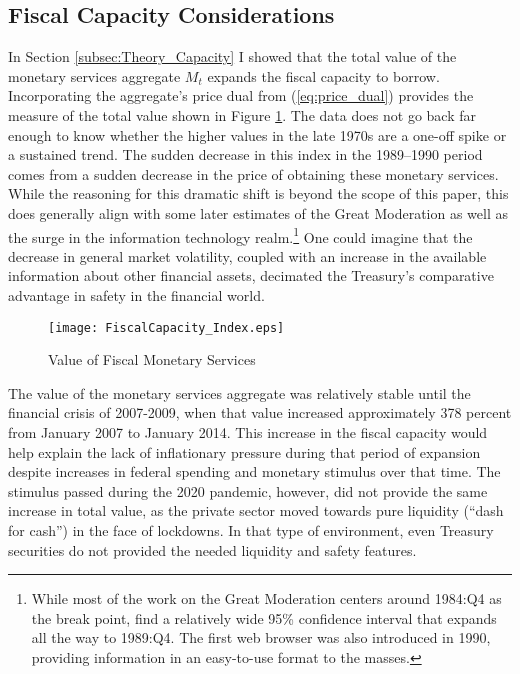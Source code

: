 \documentclass[11pt,a4paper,margin=1.5in]{article}
\begin{document}




\subsection{Fiscal Capacity Considerations}
\label{subsec:Results_Capacity}
In Section \ref{subsec:Theory_Capacity} I showed that the total value of the monetary services aggregate $M_t$ expands the fiscal capacity to borrow.
Incorporating the aggregate's price dual from (\ref{eq:price_dual}) provides the measure of the total value shown in Figure \ref{fig:FiscalServices_Value}.
The data does not go back far enough to know whether the higher values in the late 1970s are a one-off spike or a sustained trend. 
The sudden decrease in this index in the 1989--1990 period comes from a sudden decrease in the price of obtaining these monetary services.
While the reasoning for this dramatic shift is beyond the scope of this paper, this does generally align with some later estimates of the Great Moderation as well as the surge in the information technology realm.\footnote{
	While most of the work on the Great Moderation centers around 1984:Q4 as the break point, \citet{Stock-Watson:2002} find a relatively wide 95\% confidence interval that expands all the way to 1989:Q4.
	The first web browser was also introduced in 1990, providing information in an easy-to-use format to the masses.}
One could imagine that the decrease in general market volatility, coupled with an increase in the available information about other financial assets, decimated the Treasury's comparative advantage in safety in the financial world.
\begin{figure}[h]
\centering
\texttt{[image: FiscalCapacity\_Index.eps]}
\caption{Value of Fiscal Monetary Services}
\label{fig:FiscalServices_Value}
\end{figure}

The value of the monetary services aggregate was relatively stable until the financial crisis of 2007-2009, when that value increased approximately 378 percent from January 2007 to January 2014. 
This increase in the fiscal capacity would help explain the lack of inflationary pressure during that period of expansion despite increases in federal spending and monetary stimulus over that time.
The stimulus passed during the 2020 pandemic, however, did not provide the same increase in total value, as the private sector moved towards pure liquidity (``dash for cash'') in the face of lockdowns.
In that type of environment, even Treasury securities do not provided the needed liquidity and safety features.
\end{document}
